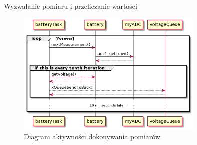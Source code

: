  
        
        \begin{kod}
          \inputminted[firstline=13]{cpp}{esp/listings/adc.cpp}
          \caption{Wyzwalanie pomiaru i przeliczanie wartości}
          \label{code:adc2}
          \vspace{2em}
        \end{kod}
        
        
        \begin{figure}[ht]
          \centering
          \includegraphics[width=0.8\textwidth]{img/adc_uml.png}
          \caption{Diagram aktywności dokonywania pomiarów}
          \label{fig:adc_plantuml}
        \end{figure}
 
        
        
        
        
        
        
        